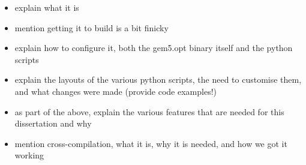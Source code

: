 \begin{itemize}
    \item explain what it is
    \item mention getting it to build is a bit finicky
    \item explain how to configure it, both the gem5.opt binary itself and the
          python scripts
    \item explain the layouts of the various python scripts, the need to
          customise them, and what changes were made (provide code examples!)
    \item as part of the above, explain the various features that are needed for
          this dissertation and why
    \item mention cross-compilation, what it is, why it is needed, and how we
          got it working
\end{itemize}